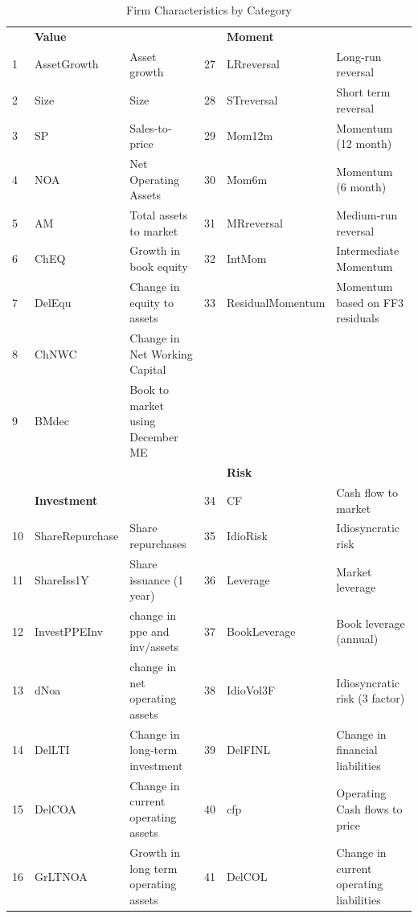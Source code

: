 \begin{table}[H]
  \footnotesize
  \centering
  \caption{Firm Characteristics by Category}
  \label{table: Firm Characteristics by Category}
  \begin{tabularx}{\linewidth}{ ll >{\setlength\hsize{11\hsize}} X ll>{\setlength\hsize{11\hsize}} X}
  \cline{1-6}
  ~ & \textbf{Value} & ~ & ~ & \textbf{Moment} \\\cline{2-3} \cline{5-6}
  1 & AssetGrowth & Asset growth & 27 & LRreversal & Long‐run reversal \\
  2 & Size & Size & 28 & STreversal & Short term reversal \\
  3 & SP & Sales‐to‐price & 29 & Mom12m & Momentum (12 month) \\
  4 & NOA & Net Operating Assets & 30 & Mom6m & Momentum (6 month) \\
  5 & AM & Total assets to market & 31 & MRreversal & Medium‐run reversal \\
  6 & ChEQ & Growth in book equity & 32 & IntMom & Intermediate Momentum \\
  7 & DelEqu & Change in equity to assets & 33 & ResidualMomentum & Momentum based on FF3 residuals \\
  8 & ChNWC & Change in Net Working Capital & ~ & ~ & ~ \\
  9 & BMdec & Book to market using December ME & ~ & ~ & ~ \\
  ~ & ~ & ~ & ~ & \textbf{Risk} & ~ \\\cline{5-6}
  ~ & \textbf{Investment} & ~ & 34 & CF & Cash flow to market \\\cline{2-3}
  10 & ShareRepurchase & Share repurchases & 35 & IdioRisk & Idiosyncratic risk \\
  11 & ShareIss1Y & Share issuance (1 year) & 36 & Leverage & Market leverage \\
  12 & InvestPPEInv & change in ppe and inv/assets & 37 & BookLeverage & Book leverage (annual) \\
  13 & dNoa & change in net operating assets & 38 & IdioVol3F & Idiosyncratic risk (3 factor) \\
  14 & DelLTI & Change in long‐term investment & 39 & DelFINL & Change in financial liabilities \\
  15 & DelCOA & Change in current operating assets & 40 & cfp & Operating Cash flows to price \\
  16 & GrLTNOA & Growth in long term operating assets & 41 & DelCOL & Change in current operating liabilities \\

\end{tabularx}
\end{table}
